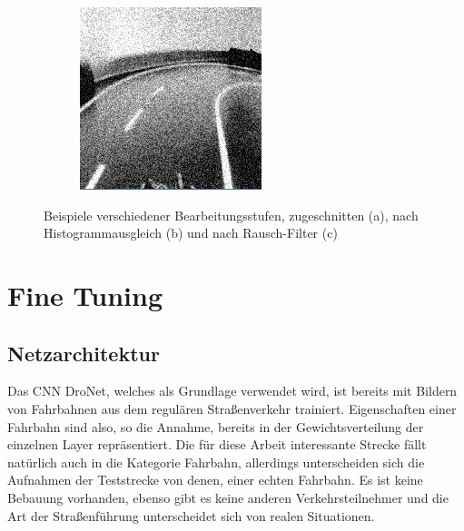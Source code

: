 \begin{figure}[h]
\begin{subfigure}{.33\textwidth}
	 	  \caption{}
		  \label{fig:imageb}
	\end{subfigure}%
	\begin{subfigure}{.33\textwidth}
	\centering
		  \includegraphics[width=0.9\linewidth]{figures/200x200Gauss.png}
	 	  \caption{}
		  \label{fig:imagec}
	\end{subfigure}%
	\caption{Beispiele verschiedener Bearbeitungsstufen, zugeschnitten (a), nach Histogrammausgleich (b) und nach Rausch-Filter (c) }
	\label{fig:pipelineexample}
\end{figure}%

\section{Fine Tuning}

\subsection{Netzarchitektur}
Das CNN DroNet, welches als Grundlage verwendet wird, ist bereits mit Bildern von Fahrbahnen aus dem regulären Straßenverkehr trainiert. Eigenschaften einer Fahrbahn sind also, so die Annahme, bereits in der Gewichtsverteilung der einzelnen Layer repräsentiert. Die für diese Arbeit interessante Strecke fällt natürlich auch in die Kategorie Fahrbahn, allerdings unterscheiden sich die Aufnahmen der Teststrecke von denen, einer echten Fahrbahn. Es ist keine Bebauung vorhanden, ebenso gibt es keine anderen Verkehrsteilnehmer und die Art der Straßenführung unterscheidet sich von realen Situationen.

